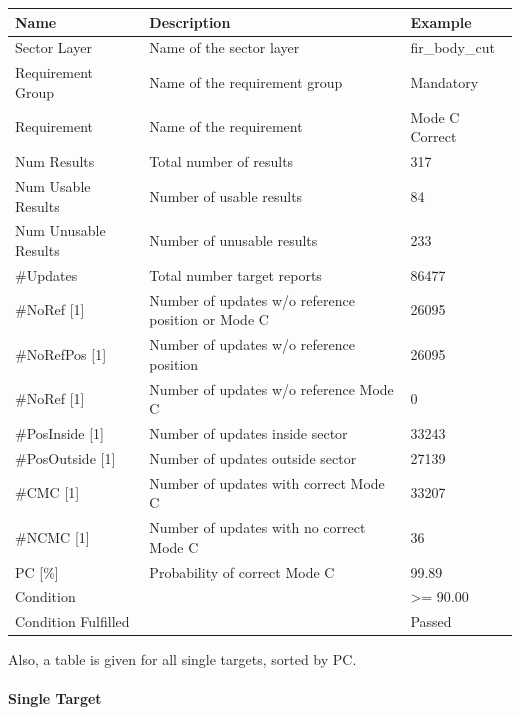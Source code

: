 \begin{center}
 \begin{table}[H]
  \begin{tabularx}{\textwidth}{ | l | X |  l | }
    \hline
    \textbf{Name} & \textbf{Description} & \textbf{Example} \\ \hline
    Sector Layer & Name of the sector layer & fir\_body\_cut \\ \hline
    Requirement Group & Name of the requirement group & Mandatory \\ \hline
    Requirement & Name of the requirement & Mode C Correct \\ \hline
    Num Results & Total number of results & 317 \\ \hline
    Num Usable Results & Number of usable results & 84 \\ \hline
    Num Unusable Results & Number of unusable results & 233 \\ \hline
    \#Updates & Total number target reports & 86477 \\ \hline
    \#NoRef [1] & Number of updates w/o reference position or Mode C & 26095 \\ \hline
    \#NoRefPos [1] & Number of updates w/o reference position  & 26095 \\ \hline
    \#NoRef [1] & Number of updates w/o reference Mode C & 0 \\ \hline
    \#PosInside [1] & Number of updates inside sector & 33243 \\ \hline
    \#PosOutside [1] & Number of updates outside sector & 27139 \\ \hline
    \#CMC [1] & Number of updates with correct Mode C & 33207 \\ \hline
    \#NCMC [1] & Number of updates with no correct Mode C & 36 \\ \hline
    PC [\%] & Probability of correct Mode C & 99.89 \\ \hline
    Condition &  & >= 90.00 \\ \hline
    Condition Fulfilled &  & Passed \\ \hline
\end{tabularx}
\end{table}
\end{center}

Also, a table is given for all single targets, sorted by PC.

\paragraph{Single Target}

